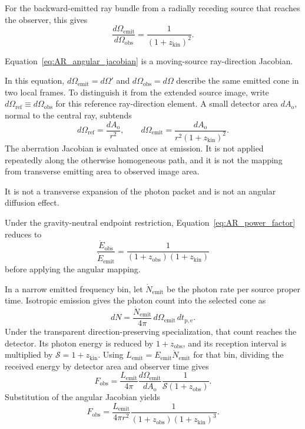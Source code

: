 For the backward-emitted ray bundle from a radially receding source that
reaches the observer, this gives
\begin{equation}
    \boxed{
    \frac{
        d\Omega_{\mathrm{emit}}
    }{
        d\Omega_{\mathrm{obs}}
    }
    =
    \frac{1}{
        (1+z_{\mathrm{kin}})^2
    }.
    }
    \label{eq:AR_angular_jacobian}
\end{equation}

Equation~\eqref{eq:AR_angular_jacobian} is a moving-source ray-direction
Jacobian.

In this equation, \(d\Omega_{\mathrm{emit}}=d\Omega'\) and
\(d\Omega_{\mathrm{obs}}=d\Omega\) describe the same emitted cone in two
local frames. To distinguish it from the extended source image, write
\(d\Omega_{\mathrm{ref}}\equiv d\Omega_{\mathrm{obs}}\) for this reference
ray-direction element. A small detector area \(dA_{\mathrm o}\), normal to
the central ray, subtends
\[
    d\Omega_{\mathrm{ref}}=\frac{dA_{\mathrm o}}{r^2},
    \qquad
    d\Omega_{\mathrm{emit}}
    =\frac{dA_{\mathrm o}}{r^2(1+z_{\mathrm{kin}})^2}.
\]
The aberration Jacobian is evaluated once at emission. It is not applied
repeatedly along the otherwise homogeneous path, and it is not the mapping
from transverse emitting area to observed image area.

It is not a transverse expansion of the photon packet and is not an angular
diffusion effect.

Under the gravity-neutral endpoint restriction, Equation~\eqref{eq:AR_power_factor}
reduces to
\begin{equation}
    \frac{
        \dot E_{\mathrm{obs}}
    }{
        \dot E_{\mathrm{emit}}
    }
    =
    \frac{1}{
        (1+z_{\mathrm{obs}})
        (1+z_{\mathrm{kin}})
    }
\end{equation}
before applying the angular mapping.

In a narrow emitted frequency bin, let \(\dot N_{\mathrm{emit}}\) be the
photon rate per source proper time. Isotropic emission gives the photon count
into the selected cone as
\[
    dN=\frac{\dot N_{\mathrm{emit}}}{4\pi}
        \,d\Omega_{\mathrm{emit}}\,dt_{\mathrm{p,e}}.
\]
Under the transparent direction-preserving specialization, that count
reaches the detector. Its photon energy is reduced by
\(1+z_{\mathrm{obs}}\), and its reception interval is multiplied by
\(\mathcal S=1+z_{\mathrm{kin}}\). Using
\(L_{\mathrm{emit}}=E_{\mathrm{emit}}\dot N_{\mathrm{emit}}\) for that bin,
dividing the received energy by detector area and observer time gives
\[
    F_{\mathrm{obs}}
    =\frac{L_{\mathrm{emit}}}{4\pi}
      \frac{d\Omega_{\mathrm{emit}}}{dA_{\mathrm o}}
      \frac{1}{\mathcal S(1+z_{\mathrm{obs}})}.
\]
Substitution of the angular Jacobian yields
\begin{equation}
    \boxed{
    F_{\mathrm{obs}}
    =
    \frac{
        L_{\mathrm{emit}}
    }{
        4\pi r^2
    }
    \frac{1}{
        (1+z_{\mathrm{obs}})
        (1+z_{\mathrm{kin}})^3
    }.
    }
    \label{eq:AR_flux_general}
\end{equation}

